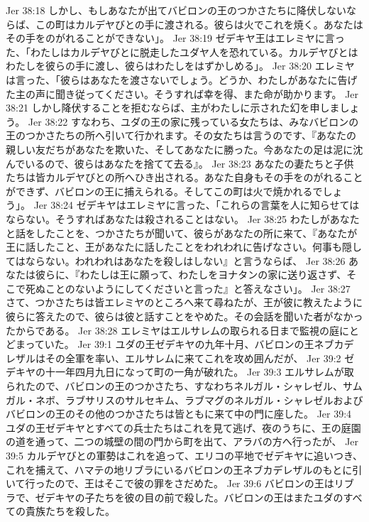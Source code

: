 Jer 38:18  しかし、もしあなたが出てバビロンの王のつかさたちに降伏しないならば、この町はカルデヤびとの手に渡される。彼らは火でこれを焼く。あなたはその手をのがれることができない」。
Jer 38:19  ゼデキヤ王はエレミヤに言った、「わたしはカルデヤびとに脱走したユダヤ人を恐れている。カルデヤびとはわたしを彼らの手に渡し、彼らはわたしをはずかしめる」。
Jer 38:20  エレミヤは言った、「彼らはあなたを渡さないでしょう。どうか、わたしがあなたに告げた主の声に聞き従ってください。そうすれば幸を得、また命が助かります。
Jer 38:21  しかし降伏することを拒むならば、主がわたしに示された幻を申しましょう。
Jer 38:22  すなわち、ユダの王の家に残っている女たちは、みなバビロンの王のつかさたちの所へ引いて行かれます。その女たちは言うのです、『あなたの親しい友だちがあなたを欺いた、そしてあなたに勝った。今あなたの足は泥に沈んでいるので、彼らはあなたを捨てて去る』。
Jer 38:23  あなたの妻たちと子供たちは皆カルデヤびとの所へひき出される。あなた自身もその手をのがれることができず、バビロンの王に捕えられる。そしてこの町は火で焼かれるでしょう」。
Jer 38:24  ゼデキヤはエレミヤに言った、「これらの言葉を人に知らせてはならない。そうすればあなたは殺されることはない。
Jer 38:25  わたしがあなたと話をしたことを、つかさたちが聞いて、彼らがあなたの所に来て、『あなたが王に話したこと、王があなたに話したことをわれわれに告げなさい。何事も隠してはならない。われわれはあなたを殺しはしない』と言うならば、
Jer 38:26  あなたは彼らに、『わたしは王に願って、わたしをヨナタンの家に送り返さず、そこで死ぬことのないようにしてくださいと言った』と答えなさい」。
Jer 38:27  さて、つかさたちは皆エレミヤのところへ来て尋ねたが、王が彼に教えたように彼らに答えたので、彼らは彼と話すことをやめた。その会話を聞いた者がなかったからである。
Jer 38:28  エレミヤはエルサレムの取られる日まで監視の庭にとどまっていた。
Jer 39:1  ユダの王ゼデキヤの九年十月、バビロンの王ネブカデレザルはその全軍を率い、エルサレムに来てこれを攻め囲んだが、
Jer 39:2  ゼデキヤの十一年四月九日になって町の一角が破れた。
Jer 39:3  エルサレムが取られたので、バビロンの王のつかさたち、すなわちネルガル・シャレゼル、サムガル・ネボ、ラブサリスのサルセキム、ラブマグのネルガル・シャレゼルおよびバビロンの王のその他のつかさたちは皆ともに来て中の門に座した。
Jer 39:4  ユダの王ゼデキヤとすべての兵士たちはこれを見て逃げ、夜のうちに、王の庭園の道を通って、二つの城壁の間の門から町を出て、アラバの方へ行ったが、
Jer 39:5  カルデヤびとの軍勢はこれを追って、エリコの平地でゼデキヤに追いつき、これを捕えて、ハマテの地リブラにいるバビロンの王ネブカデレザルのもとに引いて行ったので、王はそこで彼の罪をさだめた。
Jer 39:6  バビロンの王はリブラで、ゼデキヤの子たちを彼の目の前で殺した。バビロンの王はまたユダのすべての貴族たちを殺した。
